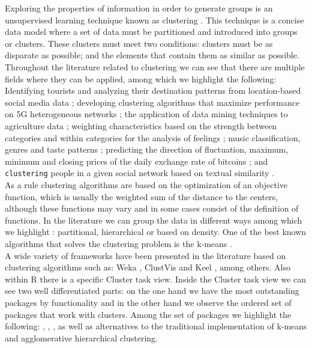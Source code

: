 Exploring the properties of information in order to generate groups is an unsupervised learning technique known as clustering \citep{b46} \citep{b47}. This technique is a concise data model where a set of data must be partitioned and introduced into groups or clusters. These clusters must meet two conditions: clusters must be as disparate as possible; and the elements that contain them as similar as possible. Throughout the literature related to clustering we can see that there are multiple fields where they can be applied, among which we highlight the following: Identifying tourists and analyzing their destination patterns from location-based social media data \citep{b1}; developing clustering algorithms that maximize performance on 5G heterogeneous networks \citep{b2}; the application of data mining techniques to agriculture data \citep{b3}; weighting characteristics based on the strength between categories and within categories for the analysis of feelings \citep{b4}; music classification, genres and taste patterns \citep{b5}; predicting the direction of fluctuation, maximum, minimum and closing prices of the daily exchange rate of bitcoins \citep{b6}; and \texttt{clustering}  people in a given social network based on textual similarity \citep{b7}.\\
As a rule clustering algorithms are based on the optimization of an objective function, which is usually the weighted sum of the distance to the centers, although these functions may vary and in some cases consist of the definition of functions. In the literature we can group the data in different ways among which we highlight \citep{b48}: partitional, hierarchical or based on density. One of the best known algorithms that solves the clustering problem is the k-means \citep{b49}.\\
A wide variety of frameworks have been presented in the literature based on clustering algorithms such as: Weka \citep{b13}, ClustVis \citep{b14} and Keel \citep{b15}, among others. Also within R there is a specific Cluster task view. Inside the Cluster task view we can see two well differentiated parts: on the one hand we have the most outstanding packages by functionality and in the other hand we observe the ordered set of packages that work with clusters. Among the set of packages we highlight the following:  \citep{b9},  \citep{b10},  \citep{b11},  \citep{b12} as well as alternatives to the traditional implementation of k-means and agglomerative hierarchical clustering.\\
